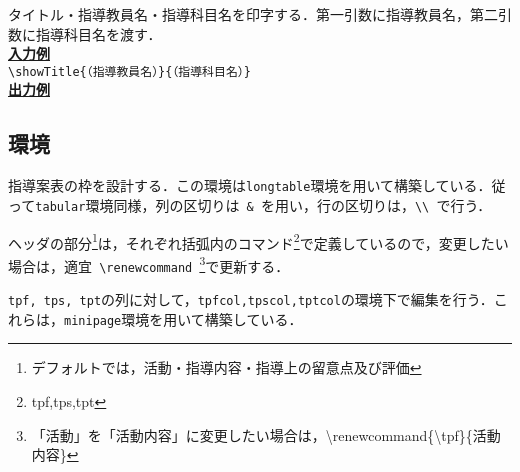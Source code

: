 \documentclass[paper=a4,fontsize=10.5pt]{jlreq}
\begin{document}
\noindent\ovalbox{\large \verb|\showTitle|}\par
タイトル・指導教員名・指導科目名を印字する．第一引数に指導教員名，第二引数に指導科目名を渡す．\\
\underline{\textbf{入力例}}\\
\verb|\showTitle{（指導教員名）}{（指導科目名）}|\\
\noindent\underline{\textbf{出力例}}
\begin{framed}
\end{framed}
\begin{leftbar}
    \section*{環境}
\end{leftbar}
\noindent{}\par
指導案表の枠を設計する．この環境は\verb|longtable|環境を用いて構築している．従って\verb|tabular|環境同様，列の区切りは\verb| & |を用い，行の区切りは，\verb|\\ |で行う．\par
ヘッダの部分\footnote{デフォルトでは，活動・指導内容・指導上の留意点及び評価}は，それぞれ括弧内のコマンド\footnote{tpf,tps,tpt}で定義しているので，変更したい場合は，適宜\verb| \renewcommand |\footnote{「活動」を「活動内容」に変更したい場合は，{\ttfamily\textbackslash renewcommand\{\textbackslash tpf\}\{活動内容\}}}で更新する．\vspace{0.5em}\\
\par
\verb|tpf, tps, tpt|の列に対して，\verb|tpfcol,tpscol,tptcol|の環境下で編集を行う．これらは，\verb|minipage|環境を用いて構築している．\par
\renewcommand{\tpf}{活動（tpf）}
\renewcommand{\tps}{指導内容（tps）}
\renewcommand{\tpt}{指導上の留意点及び評価（tpt）}
\end{document}

